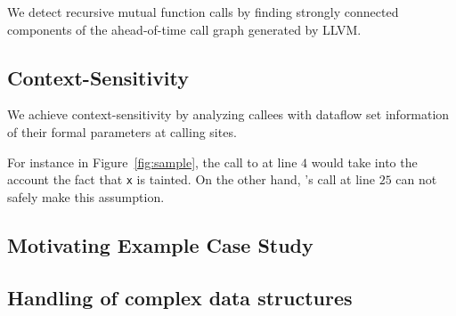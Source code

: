 We detect recursive mutual function calls by finding strongly
connected components of the ahead-of-time call graph generated
by LLVM. 

\subsection{Context-Sensitivity} 

We achieve context-sensitivity by analyzing callees
with dataflow set information of their formal parameters
at calling sites.

For instance in Figure~\ref{fig:sample}, the call to \even{} at
line $4$ would take into the account the fact that \texttt{x}
is tainted.
On the other hand, \even{}'s call at line $25$ can not safely
make this assumption.

\subsection{Motivating Example Case Study}\label{sec:sampleSummary}

\subsection{Handling of complex data structures}
